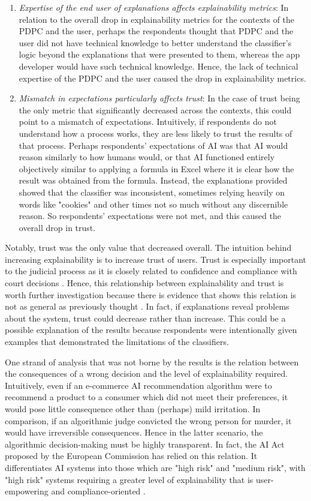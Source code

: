 \begin{enumerate}
    \item \textit{Expertise of the end user of explanations affects explainability metrics}: In relation to the overall drop in explainability metrics for the contexts of the PDPC and the user, perhaps the respondents thought that PDPC and the user did not have technical knowledge to better understand the classifier's logic beyond the explanations that were presented to them, whereas the app developer would have such technical knowledge. Hence, the lack of technical expertise of the PDPC and the user caused the drop in explainability metrics.
     
    \item \textit{Mismatch in expectations particularly affects trust}: In the case of trust being the only metric that significantly decreased across the contexts, this could point to a mismatch of expectations. Intuitively, if respondents do not understand how a process works, they are less likely to trust the results of that process. Perhaps respondents' expectations of AI was that AI would reason similarly to how humans would, or that AI functioned entirely objectively similar to applying a formula in Excel where it is clear how the result was obtained from the formula. Instead, the explanations provided showed that the classifier was inconsistent, sometimes relying heavily on words like "cookies" and other times not so much without any discernible reason. So respondents' expectations were not met, and this caused the overall drop in trust.
\end{enumerate}

Notably, trust was the only value that decreased overall. The intuition behind increasing explainability is to increase trust of users. Trust is especially important to the judicial process as it is closely related to confidence and compliance with court decisions \cite{goodman2021}. Hence, this relationship between explainability and trust is worth further investigation because there is evidence that shows this relation is not as general as previously thought \cite{kastner2021}. In fact, if explanations reveal problems about the system, trust could decrease rather than increase. This could be a possible explanation of the results because respondents were intentionally given examples that demonstrated the limitations of the classifiers.

One strand of analysis that was not borne by the results is the relation between the consequences of a wrong decision and the level of explainability required. Intuitively, even if an e-commerce AI recommendation algorithm were to recommend a product to a consumer which did not meet their preferences, it would pose little consequence other than (perhaps) mild irritation. In comparison, if an algorithmic judge convicted the wrong person for murder, it would have irreversible consequences. Hence in the latter scenario, the algorithmic decision-making must be highly transparent. In fact, the AI Act proposed by the European Commission has relied on this relation. It differentiates AI systems into those which are "high risk" and "medium risk", with "high risk" systems requiring a greater level of explainability that is user-empowering and compliance-oriented \cite{sovrano2022metrics}.

